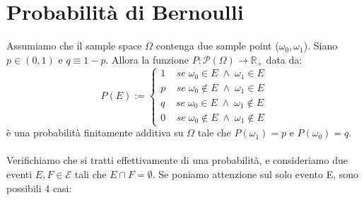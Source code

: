 \documentclass{article}
\begin{document}
\section*{Probabilità di Bernoulli}
Assumiamo che il sample space $\Omega$ contenga due sample point ($\omega_{0}, \omega_{1}$). Siano $p \in (0,1)$ e $q \equiv 1-p$. Allora la funzione $P: \mathcal{P}(\Omega) \to \mathbb{R}_{+}$ data da:
\[ P(E) :=
\begin{cases}
1 \; \; \; \; se \; \omega_{0} \in E \; \wedge \; \omega_{1} \in E\\
p \; \; \; \; se \; \omega_{0} \notin E \; \wedge \; \omega_{1} \in E\\
q \; \; \; \; se \; \omega_{0} \in E \; \wedge \; \omega_{1} \notin E\\
0 \; \; \; \; se \; \omega_{0} \notin E \; \wedge \; \omega_{1} \notin E
\end{cases}
\]
è una probabilità finitamente additiva su $\Omega$ tale che $P(\omega_{1}) = p$ e $P(\omega_{0}) = q$.\\
\\
Verifichiamo che si tratti effettivamente di una probabilità, e consideriamo due eventi $E, F \in \mathcal{E}$ tali che $E \cap F = \emptyset$. Se poniamo attenzione sul solo evento E, sono possibili 4 casi:
\end{document}
